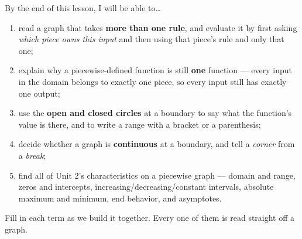 \documentclass[10pt]{article}
\begin{document}

\vspace{0.15in}

\begin{objectivebox}
\small
By the end of this lesson, I will be able to\dots
\begin{enumerate}[leftmargin=1.5em, itemsep=2pt, topsep=3pt]
  \item read a graph that takes \textbf{more than one rule}, and evaluate it by first asking
        \emph{which piece owns this input} and then using that piece's rule and only that one;
  \item explain why a piecewise-defined function is still \textbf{one} function --- every input in
        the domain belongs to exactly one piece, so every input still has exactly one output;
  \item use the \textbf{open and closed circles} at a boundary to say what the function's value is
        there, and to write a range with a bracket or a parenthesis;
  \item decide whether a graph is \textbf{continuous} at a boundary, and tell a \emph{corner} from a
        \emph{break};
  \item find all of Unit 2's characteristics on a piecewise graph --- domain and range, zeros and
        intercepts, increasing/decreasing/constant intervals, absolute maximum and minimum, end
        behavior, and asymptotes.
\end{enumerate}
\end{objectivebox}

\vspace{0.10in}

\boxguard
\begin{vocabbox}
\small
Fill in each term as we build it together. Every one of them is read straight off a graph.
\end{vocabbox}

\vspace{0.10in}
\end{document}
